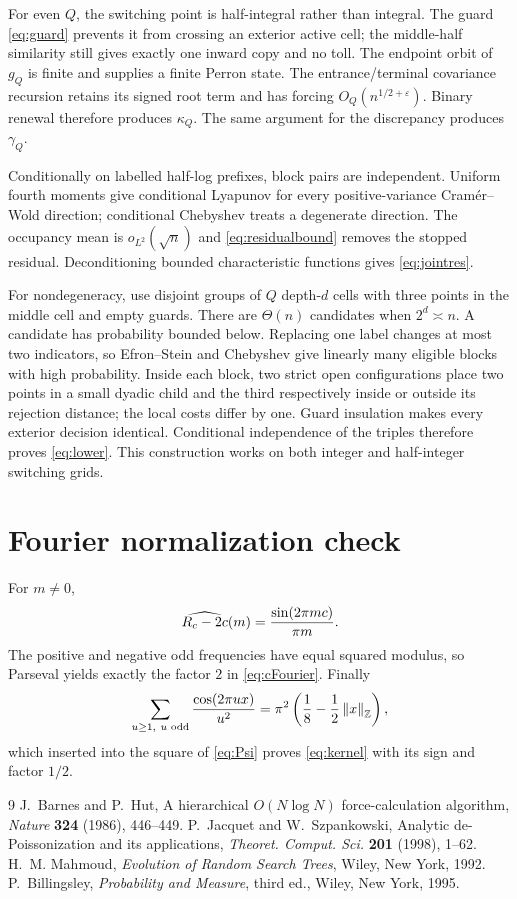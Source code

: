 \documentclass[11pt]{article}
\numberwithin{equation}{section}
\theoremstyle{definition}\newtheorem{definition}[theorem]{Definition}
\theoremstyle{remark}\newtheorem{remark}[theorem]{Remark}
\newcommand{\1}{\mathbf 1}\newcommand{\cD}{\mathcal D}
\newcommand{\norm}[1]{\left\lVert#1\right\rVert}
\begin{document}
For even $Q$, the switching point is half-integral rather than integral.
The guard \eqref{eq:guard} prevents it from crossing an exterior active
cell; the middle-half similarity still gives exactly one inward copy and
no toll.  The endpoint orbit of $g_Q$ is finite and supplies a finite Perron
state.  The entrance/terminal covariance recursion retains its signed root
term and has forcing $O_Q(n^{1/2+\varepsilon})$.  Binary renewal therefore
produces $\kappa_Q$.  The same argument for the discrepancy produces
$\gamma_Q$.

Conditionally on labelled half-log prefixes, block pairs are independent.
Uniform fourth moments give conditional Lyapunov for every positive-variance
Cram\'er--Wold direction; conditional Chebyshev treats a degenerate
direction.  The occupancy mean is $o_{L^2}(\sqrt n)$ and
\eqref{eq:residualbound} removes the stopped residual.  Deconditioning
bounded characteristic functions gives \eqref{eq:jointres}.

For nondegeneracy, use disjoint groups of $Q$ depth-$d$ cells with three
points in the middle cell and empty guards.  There are $\Theta(n)$ candidates
when $2^d\asymp n$.  A candidate has probability bounded below.  Replacing
one label changes at most two indicators, so Efron--Stein and Chebyshev give
linearly many eligible blocks with high probability.  Inside each block,
two strict open configurations place two points in a small dyadic child and
the third respectively inside or outside its rejection distance; the local
costs differ by one.  Guard insulation makes every exterior decision
identical.  Conditional independence of the triples therefore proves
\eqref{eq:lower}.  This construction works on both integer and half-integer
switching grids.

\clearpage
\section{Fourier normalization check}\label{app:fourier}
For $m\ne0$,
\begin{equation}\widehat{R_c-2c}(m)={\sin(2\pi mc)\over\pi m}.  \label{eq:Rhat}
\end{equation}
The positive and negative odd frequencies have equal squared modulus, so
Parseval yields exactly the factor $2$ in \eqref{eq:cFourier}.  Finally
\begin{equation}
 \sum_{u\ge1,\ u\text{ odd}}{\cos(2\pi ux)\over u^2}
 =\pi^2\left({1\over8}-{1\over2}\norm{x}_{\mathbb Z}\right), \label{eq:oddcos}
\end{equation}
which inserted into the square of \eqref{eq:Psi} proves
\eqref{eq:kernel} with its sign and factor $1/2$.

\begin{thebibliography}{9}
 J.~Barnes and P.~Hut, A hierarchical $O(N\log N)$
force-calculation algorithm, \emph{Nature} \textbf{324} (1986), 446--449.
 P.~Jacquet and W.~Szpankowski, Analytic de-Poissonization and
its applications, \emph{Theoret. Comput. Sci.} \textbf{201} (1998), 1--62.
 H.~M. Mahmoud, \emph{Evolution of Random Search Trees},
Wiley, New York, 1992.
 P.~Billingsley, \emph{Probability and Measure},
third ed., Wiley, New York, 1995.
\end{thebibliography}
\end{document}
